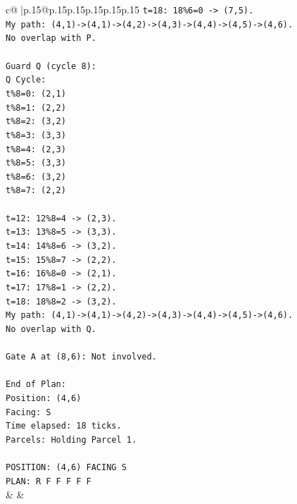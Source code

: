 \documentclass{article}
\begin{document}
{\begin{supertabular}{c@{$\;$}|p{.15\linewidth}@{}p{.15\linewidth}p{.15\linewidth}p{.15\linewidth}p{.15\linewidth}p{.15\linewidth}}
{{{\texttt{t=18: 18\%6=0 {-}> (7,5).} \\
\texttt{My path: (4,1){-}>(4,1){-}>(4,2){-}>(4,3){-}>(4,4){-}>(4,5){-}>(4,6).} \\
\texttt{No overlap with P.} \\
\\ 
\texttt{Guard Q (cycle 8):} \\
\texttt{Q Cycle:} \\
\texttt{t\%8=0: (2,1)} \\
\texttt{t\%8=1: (2,2)} \\
\texttt{t\%8=2: (3,2)} \\
\texttt{t\%8=3: (3,3)} \\
\texttt{t\%8=4: (2,3)} \\
\texttt{t\%8=5: (3,3)} \\
\texttt{t\%8=6: (3,2)} \\
\texttt{t\%8=7: (2,2)} \\
\\ 
\texttt{t=12: 12\%8=4 {-}> (2,3).} \\
\texttt{t=13: 13\%8=5 {-}> (3,3).} \\
\texttt{t=14: 14\%8=6 {-}> (3,2).} \\
\texttt{t=15: 15\%8=7 {-}> (2,2).} \\
\texttt{t=16: 16\%8=0 {-}> (2,1).} \\
\texttt{t=17: 17\%8=1 {-}> (2,2).} \\
\texttt{t=18: 18\%8=2 {-}> (3,2).} \\
\texttt{My path: (4,1){-}>(4,1){-}>(4,2){-}>(4,3){-}>(4,4){-}>(4,5){-}>(4,6).} \\
\texttt{No overlap with Q.} \\
\\ 
\texttt{Gate A at (8,6): Not involved.} \\
\\ 
\texttt{End of Plan:} \\
\texttt{Position: (4,6)} \\
\texttt{Facing: S} \\
\texttt{Time elapsed: 18 ticks.} \\
\texttt{Parcels: Holding Parcel 1.} \\
\\ 
\texttt{POSITION: (4,6) FACING S} \\
\texttt{PLAN: R F F F F F} \\
            }
        }
    }
    & & \\ \\


\end{supertabular}}
\end{document}
